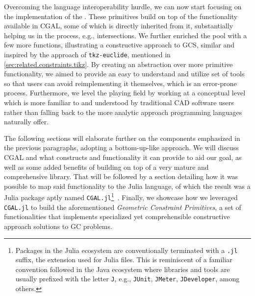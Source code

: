 Overcoming the language interoperability hurdle, we can now start focusing on
the implementation of the \primitives.  These primitives build on top of the
functionality available in \ac{CGAL}, some of which is directly inherited from
it, substantially helping us in the process, e.g., intersections.  We further
enriched the pool with a few more functions, illustrating a constructive
approach to \ac{GCS}, similar and inspired by the approach of
\texttt{tkz-euclide}, mentioned in \cref{sec:related.constraints.tikz}.  By
creating an abstraction over more primitive functionality, we aimed to provide
an easy to understand and utilize set of tools so that users can avoid
reimplementing it themselves, which is an error-prone process.  Furthermore, we
level the playing field by working at a conceptual level which is more familiar
to and understood by traditional \ac{CAD} software users rather than falling
back to the more analytic approach programming languages naturally offer.

The following sections will elaborate further on the components emphasized in
the previous paragraphs, adopting a bottom-up-like approach.  We will discuss
\ac{CGAL} and what constructs and functionality it can provide to aid our goal,
as well as some added benefits of building on top of a very mature and
comprehensive library.  That will be followed by a section detailing how it was
possible to map said functionality to the Julia language, of which the result
was a Julia package aptly named \texttt{CGAL.jl}\footnote{Packages in the Julia
ecosystem are conventionally terminated with a \texttt{.jl} suffix, the
extension used for Julia files.  This is reminiscent of a familiar convention
followed in the Java ecosystem where libraries and tools are usually prefixed
with the letter \texttt{J}, e.g., \texttt{JUnit}, \texttt{JMeter},
\texttt{JDeveloper}, among others.}~\cite{Ventura:2021:CGAL.jl}.  Finally, we
showcase how we leveraged \texttt{CGAL.jl} to build the aforementioned
\textit{Geometric Constraint Primitives}, a set of functionalities that implements
specialized yet comprehensible constructive approach solutions to \ac{GC}
problems.




